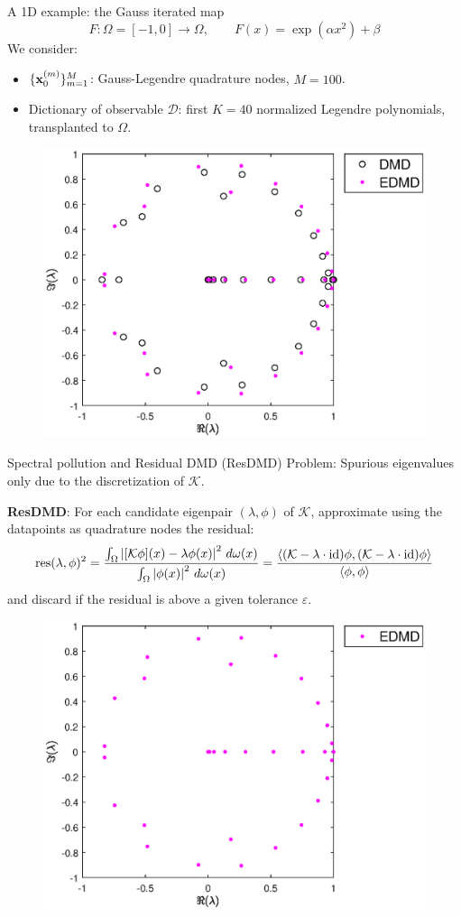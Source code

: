 \documentclass{beamer}
\begin{document}
\begin{frame}{A 1D example: the Gauss iterated map}
\begin{equation*}
    F:\Omega = [-1, 0] \to\Omega, \qquad F(x) =\exp(\alpha x^2) + \beta 
\end{equation*}
We consider:
\begin{itemize}
    \item $\{\vb{x}_0^{(m)}\}_{m = 1}^M$: Gauss-Legendre quadrature nodes, $M = 100$.
    \item Dictionary of observable $\mathcal{D}$: first $K = 40$ normalized Legendre polynomials, transplanted to $\Omega$.
\end{itemize}
\begin{figure}[h]
    \centering
    \includegraphics[width=0.55\linewidth]{../code/figures/gauss_map/presentation.eps}
\end{figure}
\end{frame}

\begin{frame}{Spectral pollution and Residual DMD (ResDMD)}
\alert{Problem:} Spurious eigenvalues only due to the discretization of $\mathcal{K}$.

\medskip
\textbf{ResDMD}: For each candidate eigenpair $(\lambda, \phi)$ of $\mathcal{K}$, approximate using the datapoints as quadrature nodes the residual:
\begin{equation*}
    \mathrm{res}(\lambda, \phi)^2 = \frac{\int_{\Omega} \abs{[\mathcal{K}\phi](x) - \lambda\phi(x)}^2\,\,d\omega(x)}{\int_{\Omega} \abs{\phi(x)}^2\,\,d\omega(x)} 
        = \frac{\langle (\mathcal{K} - \lambda \cdot\mathrm{id})\phi, (\mathcal{K} - \lambda \cdot \mathrm{id})\phi \rangle}{\langle\phi , \phi \rangle}
\end{equation*}
and discard if the residual is above a given tolerance $\varepsilon$.
\begin{figure}[h]
    \centering
    \includegraphics[width=0.55\linewidth]{../code/figures/gauss_map/presentation_EDMD.eps}
\end{figure}
\end{frame}
\end{document}
